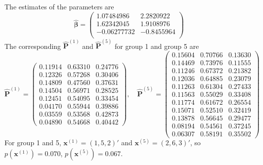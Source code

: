 \documentclass[12pt]{article}
\newcommand{\betavec}{{\boldsymbol{\beta}}}
\newcommand{\Pmat}{\mathbf{P}}
\newcommand{\wh}{\widehat}
\newcommand{\xvec}{\boldsymbol{x}}
\begin{document}
The estimates of the parameters are
\begin{equation*}
\wh{\betavec} =
\begin{pmatrix}
 1.07484986 & 2.2820922 \\
 1.62342045 & 1.9108976 \\
 -0.06277732 &-0.8455964\\
\end{pmatrix}
\end{equation*}
The corresponding $\wh{\Pmat}^{(1)}$ and $\wh{\Pmat}^{(5)}$ for group 1 and group 5 are
\begin{equation*}
    \wh{\Pmat}^{(1)} = \begin{pmatrix}

 0.11914 & 0.63310 & 0.24776\\
 0.12326 & 0.57268 & 0.30406\\
 0.14809 & 0.47560 & 0.37631\\
 0.14504 & 0.56971 & 0.28525\\
 0.12451 & 0.54095 & 0.33454\\
 0.04170 & 0.55944 & 0.39886\\
 0.03559 & 0.53568 & 0.42873\\
 0.04890 & 0.54668 & 0.40442
    \end{pmatrix}, \quad
    \wh{\Pmat}^{(5)} = \begin{pmatrix}
 0.15604 & 0.70766 & 0.13630\\
 0.14469 & 0.73976 & 0.11555\\
 0.11246 & 0.67372 & 0.21382\\
 0.12036 & 0.64885 & 0.23079\\
 0.11263 & 0.61304 & 0.27433\\
 0.11563 & 0.55029 & 0.33408\\
 0.11774 & 0.61672 & 0.26554\\
 0.15071 & 0.52510 & 0.32419\\
 0.13878 & 0.56645 & 0.29477\\
 0.08194 & 0.54561 & 0.37245\\
 0.06307 & 0.58191 & 0.35502
    \end{pmatrix}
\end{equation*}
For group 1 and 5, $\xvec^{(1)} = (1,5,2)'$ and $\xvec^{(5)} = (2,6,3)'$, so $p(\xvec^{(1)}) = 0.070$, $p(\xvec^{(5)}) = 0.067$.

\end{document}
